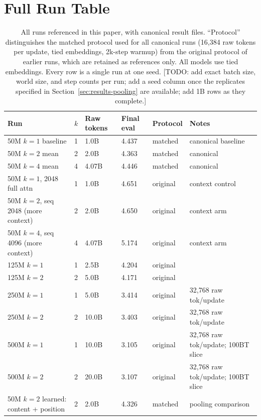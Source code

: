 \documentclass[11pt]{article}
\newcommand{\todo}[1]{\textcolor{warnred}{[TODO: #1]}}
\begin{document}
\section{Full Run Table}
\label{app:runs}

\begin{table}[h]
\centering
\caption{All runs referenced in this paper, with canonical result files.
``Protocol'' distinguishes the matched protocol used for all canonical runs
(16{,}384 raw tokens per update, tied embeddings, 2k-step warmup) from the
original protocol of earlier runs, which are retained as references only.
All models use tied embeddings.
Every row is a single run at one seed.
\todo{add exact batch size, world size, and step counts per run; add a seed
column once the replicates specified in Section~\ref{sec:results-pooling}
are available; add 1B rows as they complete.}}
\label{tab:runs}
\vspace{0.4em}
\scriptsize
\begin{tabular}{llllll}
\toprule
Run & $k$ & Raw tokens & Final eval & Protocol & Notes \\
\midrule
50M $k{=}1$ baseline & 1 & 1.0B & 4.437 & matched & canonical baseline \\
50M $k{=}2$ mean & 2 & 2.0B & 4.363 & matched & canonical \\
50M $k{=}4$ mean & 4 & 4.07B & 4.446 & matched & canonical \\
50M $k{=}1$, 2048 full attn & 1 & 1.0B & 4.651 & original & context control \\
50M $k{=}2$, seq 2048 (more context) & 2 & 2.0B & 4.650 & original & context arm \\
50M $k{=}4$, seq 4096 (more context) & 4 & 4.07B & 5.174 & original & context arm \\
125M $k{=}1$ & 1 & 2.5B & 4.204 & original & \\
125M $k{=}2$ & 2 & 5.0B & 4.171 & original & \\
250M $k{=}1$ & 1 & 5.0B & 3.414 & original & 32{,}768 raw tok/update \\
250M $k{=}2$ & 2 & 10.0B & 3.403 & original & 32{,}768 raw tok/update \\
500M $k{=}1$ & 1 & 10.0B & 3.105 & original & 32{,}768 raw tok/update; 100BT slice \\
500M $k{=}2$ & 2 & 20.0B & 3.107 & original & 32{,}768 raw tok/update; 100BT slice \\
50M $k{=}2$ learned: content + position & 2 & 2.0B & 4.326 & matched & pooling comparison \\

\end{tabular}
\end{table}
\end{document}
